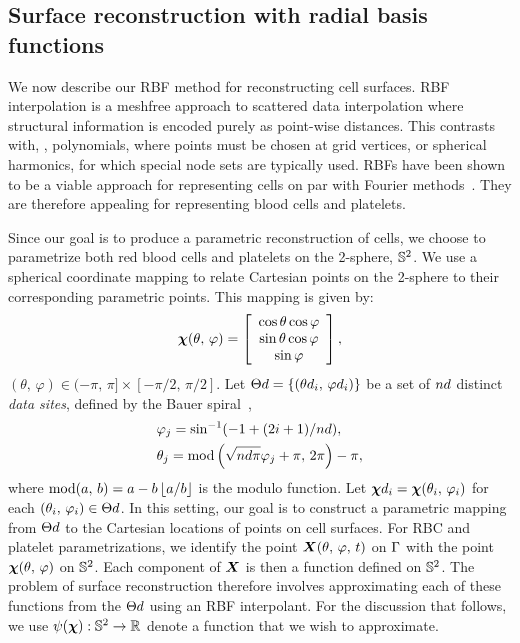 \subsection{Surface reconstruction with radial basis functions}\label{sec:rbf-interpolation}

We now describe our RBF method for reconstructing cell surfaces. RBF interpolation is a
meshfree approach to scattered data interpolation where structural information is encoded
purely as point-wise distances. This contrasts with, , polynomials, where
points must be chosen at grid vertices, or spherical harmonics, for which special node
sets are typically used. RBFs have been shown to be a viable approach for representing
cells on par with Fourier methods~\cite{Shankar:2013ki}. They are therefore appealing for
representing blood cells and platelets.

Since our goal is to produce a parametric reconstruction of cells, we choose to
parametrize both red blood cells and platelets on the 2-sphere, $\mathbb{S}^2$. We use a
spherical coordinate mapping to relate Cartesian points on the 2-sphere to their
corresponding parametric points. This mapping is given by:
\begin{equation}
    \boldsymbol{\chi}(\theta,\,\varphi) =
    \left[\begin{array}{c}
        \cos\theta\cos\varphi \\
        \sin\theta\cos\varphi \\
        \sin\varphi
    \end{array}\right],
\end{equation}
$(\theta,\,\varphi)\in(-\pi,\,\pi]\times[-\pi/2,\,\pi/2]$.
Let $\data\sites = \{(\data\theta_i,\,\data\varphi_i)\}$ be a set of $\data\cardinality$
distinct \emph{data sites}, defined by the Bauer spiral~\cite{Bauer:2000km},
\begin{equation}\label{eq:bauer-spiral}
    \begin{aligned}
        &\varphi_j = \sin^{-1}(-1 + (2i + 1) / \data\cardinality), \\ %
        &\theta_j = \modulo\left(\sqrt{\data\cardinality\pi}\varphi_j + \pi,\,2\pi\right) - \pi,
    \end{aligned}
\end{equation}
where $\operatorname{mod}(a,\,b) = a - b\left\lfloor{a/b}\right\rfloor$ is the modulo function. Let
$\data\Xp_i = \Xp(\theta_i,\,\varphi_i)$ for each $(\theta_i,\,\varphi_i)\in\data\sites$.
In this setting, our goal is to construct a parametric mapping from $\data\sites$ to the
Cartesian locations of points on cell surfaces. For RBC and platelet parametrizations, we
identify the point $\boldsymbol{X}(\theta,\,\varphi,\,t)$ on $\Gamma$ with the point
$\boldsymbol{\chi}(\theta,\,\varphi)$ on $\mathbb{S}^2$. Each component of $\boldsymbol{X}$ is then a function defined
on $\mathbb{S}^2$. The problem of surface reconstruction therefore involves approximating each
of these functions from the $\data\sites$ using an RBF interpolant. For the discussion
that follows, we use $\psi(\boldsymbol{\chi}) : \mathbb{S}^2 \to \mathbb{R}$ denote a function that we wish
to approximate.

